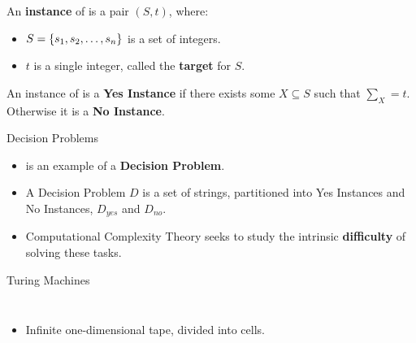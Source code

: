 \documentclass[c]{beamer}
\begin{document}
\begin{frame}{\subsum{}}

  An \textbf{instance} of \subsum{} is a pair $(S, t)$, where:

    \begin{itemize}
    \item $S = \{s_1, s_2, \ldots, s_n\}$ is a set of integers.
    \item $t$ is a single integer, called the \textbf{target} for $S$.
    \end{itemize}\pause

    \vspace{\baselineskip}

    An instance of \subsum{} is a \textbf{Yes Instance} if
    there exists some $X \subseteq S$ such that $\sum_X = t$.\\
    Otherwise it is a \textbf{No Instance}.
\end{frame}

\begin{frame}{Decision Problems}

  \begin{itemize}
  \item \subsum{} is an example of a \textbf{Decision Problem}.\pause
  \item A Decision Problem $D$ is a set of strings,
    partitioned into Yes Instances and No Instances, $D_{yes}$ and
    $D_{no}$.\pause
  \item Computational Complexity Theory seeks to study the intrinsic
    \textbf{difficulty} of solving these tasks.
  \end{itemize}

\end{frame}

  


\begin{frame}{Turing Machines}
  \begin{columns}

    \begin{itemize}
    \item Infinite one-dimensional tape, divided into cells.    
    \end{itemize}
  \end{columns}
\end{frame}
\end{document}
